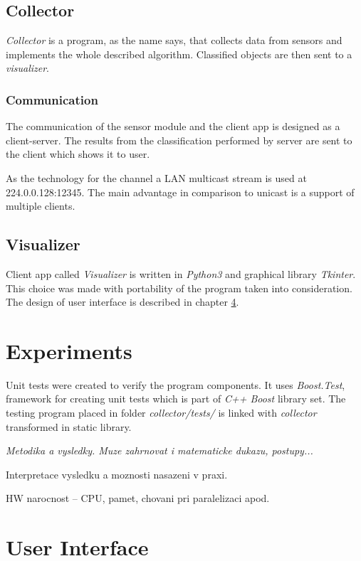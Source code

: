 \section{Collector}
{\it Collector} is a program, as the name says, that collects data from sensors and implements
the whole described algorithm. Classified objects are then sent to a {\it visualizer}.

\subsection*{Communication}
The communication of the sensor module and the client app is designed as a client-server. The results
from the classification performed by server are sent to the client which shows it to user.

As the technology for the channel a LAN multicast stream is used at 224.0.0.128:12345.
The main advantage in comparison to unicast is a support of multiple clients.

\section{Visualizer}
Client app called {\it Visualizer} is written in {\it Python3} and graphical library {\it Tkinter}.
This choice was made with portability of the program taken into consideration.
The design of user interface is described in chapter \ref{Label:UI}.




\chapter{Experiments}
Unit tests were created to verify the program components. It uses {\it Boost.Test},
framework for creating unit tests which is part of {\it C++ Boost} library set.
The testing program placed in folder {\it collector/tests/} is linked with
{\it collector} transformed in static library.

{\it
Metodika a vysledky. Muze zahrnovat i matematicke dukazu, postupy...

Interpretace vysledku a moznosti nasazeni v praxi.

HW narocnost -- CPU, pamet, chovani pri paralelizaci apod.
}




\chapter{User Interface}
\label{Label:UI}

